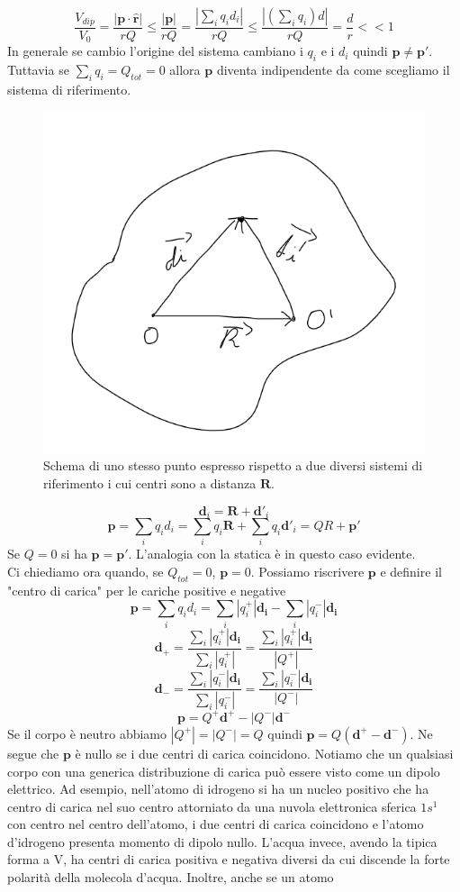 \documentclass[
10pt, %
a4paper, %
oneside, %
headinclude,footinclude, %
BCOR5mm, %
]{scrartcl}
\begin{document}
 \[\frac{V_{dip}}{V_0} = \frac{|\mathbf{p}\cdot \hat{\mathbf{r}}|}{rQ}\leq\frac{|\mathbf{p}|}{rQ} = \frac{|\sum_i q_i d_i|}{rQ}\leq \frac{|(\sum_i q_i)d|}{rQ} = \frac{d}{r}<<1\]
 In generale se cambio l'origine del sistema cambiano i \(q_i\) e i \(d_i\) quindi \(\mathbf{p}\neq\mathbf{p}'\). Tuttavia se \(\sum_i q_i = Q_{tot} = 0\) allora $\mathbf{p}$ diventa indipendente da come scegliamo il sistema di riferimento. 
\begin{figure}[h!]
	\centering
	\includegraphics[width=0.5\linewidth]{images/dipolo_SR}
	\caption{Schema di uno stesso punto espresso rispetto a due diversi sistemi di riferimento i cui centri sono a distanza \(\mathbf{R}\).}
	\label{fig:dipolosr}
\end{figure}
\FloatBarrier
\[\mathbf{d}_i = \mathbf{R}+\mathbf{d}'_i\]
\[\mathbf{p} = \sum_iq_id_i = \sum_iq_i\mathbf{R}+\sum_iq_i\mathbf{d}'_i=QR+\mathbf{p}'\]
Se \(Q = 0\) si ha \(\mathbf{p} = \mathbf{p}'\). L'analogia con la statica è in questo caso evidente.\\
Ci chiediamo ora quando, se \(Q_{tot} = 0\), $\mathbf{p} = 0$. Possiamo riscrivere $\mathbf{p}$ e definire il "centro di carica" per le cariche positive e negative 
\[\mathbf{p} = \sum_iq_id_i = \sum_i|q_i^+|\mathbf{d_i}-\sum_i|q_i^-|\mathbf{d_i}\]
\[\mathbf{d}_+ = \frac{\sum_i|q_i^+|\mathbf{d_i}}{\sum_i|q_i^+|} = \frac{\sum_i|q_i^+|\mathbf{d_i}}{|Q^+|}\]
\[\mathbf{d}_- = \frac{\sum_i|q_i^-|\mathbf{d_i}}{\sum_i|q_i^-|} = \frac{\sum_i|q_i^-|\mathbf{d_i}}{|Q^-|}\]
\[\mathbf{p} = Q^+\mathbf{d}^+-|Q^-|\mathbf{d}^-\]
Se il corpo è neutro abbiamo \(|Q^+|=|Q^-|=Q\) quindi \(\mathbf{p} = Q(\mathbf{d}^+-\mathbf{d}^-)\). Ne segue che $\mathbf{p}$ è nullo se i due centri di carica coincidono. Notiamo che un qualsiasi corpo con una generica distribuzione di carica può essere visto come un dipolo elettrico. Ad esempio, nell'atomo di idrogeno si ha un nucleo positivo che ha centro di carica nel suo centro attorniato da una nuvola elettronica sferica \(1s^1\) con centro nel centro dell'atomo, i due centri di carica coincidono e l'atomo d'idrogeno presenta momento di dipolo nullo. L'acqua invece, avendo la tipica forma a V, ha centri di carica positiva e negativa diversi da cui discende la forte polarità della molecola d'acqua. Inoltre, anche se un atomo 
\end{document}

